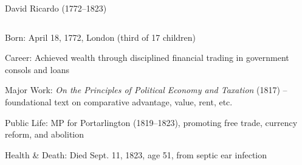 \documentclass[notes,11pt, aspectratio=169, xcolor=table]{beamer}
\newenvironment{wideitemize}{\itemize\addtolength{\itemsep}{10pt}}{\enditemize}
\begin{document}
\begin{frame}{David Ricardo (1772–1823)}
\begin{columns}
    \begin{column}{0.65\textwidth}
        \begin{wideitemize}
            \item Born: April 18, 1772, London (third of 17 children)
            \item Career: Achieved wealth through disciplined financial trading in government consols and loans
            \item Major Work: \textit{On the Principles of Political Economy and Taxation} (1817) – foundational text on comparative advantage, value, rent, etc.
            \item Public Life: MP for Portarlington (1819–1823), promoting free trade, currency reform, and abolition
            \item Health & Death: Died Sept. 11, 1823, age 51, from septic ear infection
        \end{wideitemize}
    \end{column}
    

\end{columns}
\end{frame}
\end{document}

